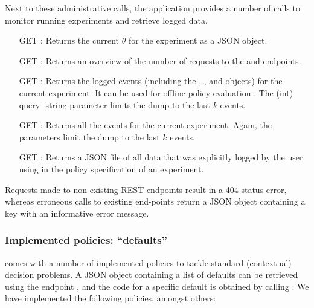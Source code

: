 \documentclass[nojss]{jss}
\begin{document}
Next to these administrative calls, the application provides a number of calls to monitor running experiments and retrieve logged data. 

\begin{itemize}
\item [GET] : Returns the current $\theta$ for the experiment as a JSON object.
\item [GET] : Returns an overview of the number of requests to the  and  endpoints.
\item [GET] : Returns the logged  events (including the , , and  objects) for the current experiment. It can be used for offline policy evaluation \citep[see, e.g., ][]{Li2010a, agarwal2016making}. The  (int) query- string parameter limits the dump to the last $k$ events.
\item [GET] : Returns all the  events for the current experiment. Again, the  parameters limit the dump to the last $k$ events.
\item [GET] : Returns a JSON file of all data that was explicitly logged by the user using  in the policy specification of an  experiment.
\end{itemize}

Requests made to non-existing REST endpoints result in a 404 status error, whereas erroneous calls to existing end-points return a JSON object containing a key  with an informative error message.

\subsubsection{Implemented policies: ``defaults''}
\label{sec:defaults}

 comes with a number of implemented policies to tackle standard (contextual) decision problems. A JSON object containing a list of defaults can be retrieved using the endpoint , and the code for a specific default is obtained by calling . We have implemented the following policies, amongst others:
\end{document}
